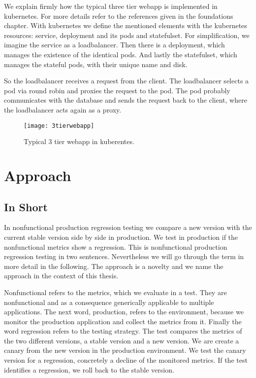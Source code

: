 We explain firmly how the typical three tier webapp is implemented in kubernetes. For more
details refer to the references given in the foundations chapter. With kubernetes we
define the mentioned elements with the kubernetes resources: service, deployment and its
pods and statefulset. For simplification, we imagine the service as a loadbalancer. Then
there is a deployment, which manages the existence of the identical pods. And lastly the
statefulset, which manages the stateful pods, with their unique name and disk.

So the loadbalancer receives a request from the client. The loadbalancer selects a pod via
round robin and proxies the request to the pod. The pod probably communicates with the
database and sends the request back to the client, where the loadbalancer acts again as a
proxy.


\begin{figure}[htbp]
  \centering
  \texttt{[image: 3tierwebapp]}
  \caption[3tierwebapp]{Typical 3 tier webapp in kuberentes.}
  \label{fig:3tierwebapp}
\end{figure}


\chapter{Approach}

\section{In Short}

In nonfunctional production regression testing we compare a new version with the current
stable version side by side in production. We test in production if the nonfunctional
metrics show a regression. This is nonfunctional production regression testing in two
sentences.  Nevertheless we will go through the term in more detail in the following. The
approach is a novelty and we name the approach in the context of this thesis.

Nonfunctional refers to the metrics, which we evaluate in a test. They are nonfunctional
and as a consequence generically applicable to multiple applications. The next word,
production, refers to the environment, because we monitor the production application and
collect the metrics from it. Finally the word regression refers to the testing
strategy. The test compares the metrics of the two different versions, a stable version
and a new version. We are create a canary from the new version in the production
environment. We test the canary version for a regression, concretely a decline of the
monitored metrics. If the test identifies a regression, we roll back to the stable
version.


